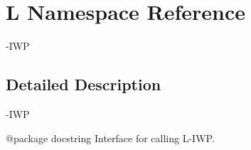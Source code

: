 \hypertarget{namespaceL}{}\section{L Namespace Reference}
\label{namespaceL}


-\/\+I\+WP  




\subsection{Detailed Description}
-\/\+I\+WP 

\begin{DoxyVerb}@package docstring
Interface for calling L-IWP. 
\end{DoxyVerb}
 
